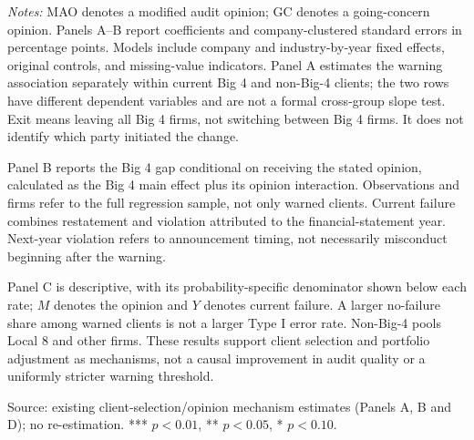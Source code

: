 \documentclass{article}
\begin{document}
\begin{minipage}{19cm}
\begin{tabular*}{\linewidth}{@{\extracolsep{\fill}}lrrrr@{}}
\bottomrule\end{tabular*}
\par\medskip\raggedright\footnotesize
\textit{Notes:} MAO denotes a modified audit opinion; GC denotes a going-concern opinion. Panels A--B report coefficients and company-clustered standard errors in percentage points. Models include company and industry-by-year fixed effects, original controls, and missing-value indicators. Panel A estimates the warning association separately within current Big 4 and non-Big-4 clients; the two rows have different dependent variables and are not a formal cross-group slope test. Exit means leaving all Big 4 firms, not switching between Big 4 firms. It does not identify which party initiated the change.\par\smallskip
Panel B reports the Big 4 gap conditional on receiving the stated opinion, calculated as the Big 4 main effect plus its opinion interaction. Observations and firms refer to the full regression sample, not only warned clients. Current failure combines restatement and violation attributed to the financial-statement year. Next-year violation refers to announcement timing, not necessarily misconduct beginning after the warning.\par\smallskip
Panel C is descriptive, with its probability-specific denominator shown below each rate; $M$ denotes the opinion and $Y$ denotes current failure. A larger no-failure share among warned clients is not a larger Type I error rate. Non-Big-4 pools Local 8 and other firms. These results support client selection and portfolio adjustment as mechanisms, not a causal improvement in audit quality or a uniformly stricter warning threshold.\par\smallskip
Source: existing client-selection/opinion mechanism estimates (Panels A, B and D); no re-estimation. *** $p<0.01$, ** $p<0.05$, * $p<0.10$.
\end{minipage}
\end{document}
